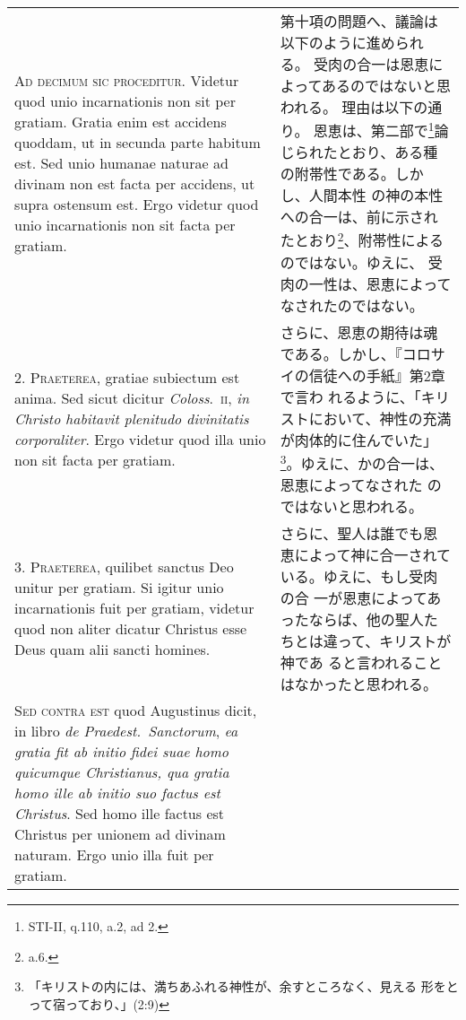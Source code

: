 \documentclass[10pt]{jsarticle} %
\begin{document}
\begin{longtable}{p{21em}p{21em}}

{\Huge A}{\scshape d decimum sic proceditur}. Videtur quod unio incarnationis non sit per
gratiam. Gratia enim est accidens quoddam, ut in secunda parte habitum
est. Sed unio humanae naturae ad divinam non est facta per accidens, ut
supra ostensum est. Ergo videtur quod unio incarnationis non sit facta
per gratiam.

&

第十項の問題へ、議論は以下のように進められる。
受肉の合一は恩恵によってあるのではないと思われる。
理由は以下の通り。
恩恵は、第二部で\footnote{STI-II, q.110, a.2, ad 2.}論じられたとおり、ある種の附帯性である。しかし、人間本性
の神の本性への合一は、前に示されたとおり\footnote{a.6.}、附帯性によるのではない。ゆえに、
受肉の一性は、恩恵によってなされたのではない。

\\



2. {\scshape Praeterea}, gratiae subiectum est anima. Sed sicut dicitur {\itshape Coloss}.~{\scshape ii}, {\itshape in
Christo habitavit plenitudo divinitatis corporaliter}. Ergo videtur quod
illa unio non sit facta per gratiam.

&

さらに、恩恵の期待は魂である。しかし、『コロサイの信徒への手紙』第2章で言わ
れるように、「キリストにおいて、神性の充満が肉体的に住んでいた」
\footnote{「キリストの内には、満ちあふれる神性が、余すところなく、見える
形をとって宿っており、」(2:9)}。ゆえに、かの合一は、恩恵によってなされた
のではないと思われる。

\\



3. {\scshape Praeterea}, quilibet sanctus Deo unitur per gratiam. Si igitur unio
incarnationis fuit per gratiam, videtur quod non aliter dicatur Christus
esse Deus quam alii sancti homines.

&

さらに、聖人は誰でも恩恵によって神に合一されている。ゆえに、もし受肉の合
 一が恩恵によってあったならば、他の聖人たちとは違って、キリストが神であ
 ると言われることはなかったと思われる。

\\



{\scshape Sed contra est} quod Augustinus dicit, in libro {\itshape de Praedest.~Sanctorum},
{\itshape ea gratia fit ab initio fidei suae homo quicumque Christianus, qua
gratia homo ille ab initio suo factus est Christus}. Sed homo ille factus
est Christus per unionem ad divinam naturam. Ergo unio illa fuit per
gratiam.


\end{longtable}
\end{document}
